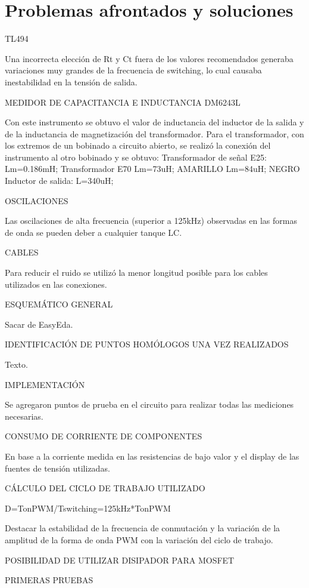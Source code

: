 \section{Problemas afrontados y soluciones}

TL494

Una incorrecta elección de Rt y Ct fuera de los valores recomendados generaba variaciones muy grandes de la frecuencia de switching, 
lo cual causaba inestabilidad en la tensión de salida. 

MEDIDOR DE CAPACITANCIA E INDUCTANCIA DM6243L

Con este instrumento se obtuvo el valor de inductancia del inductor de la salida y de la inductancia de magnetización del transformador. 
Para el transformador, con los extremos de un bobinado a circuito abierto, se realizó la conexión del instrumento al otro bobinado y se obtuvo:
Transformador de señal E25:
Lm=0.186mH; 
Transformador E70
Lm=73uH; AMARILLO 
Lm=84uH; NEGRO
Inductor de salida:
L=340uH;

OSCILACIONES

Las oscilaciones de alta frecuencia (superior a 125kHz) observadas en las formas de onda se pueden deber a cualquier tanque LC. 

CABLES

Para reducir el ruido se utilizó la menor longitud posible para los cables utilizados en las conexiones. 

ESQUEMÁTICO GENERAL 

Sacar de EasyEda. 

IDENTIFICACIÓN DE PUNTOS HOMÓLOGOS UNA VEZ REALIZADOS 

Texto.

IMPLEMENTACIÓN

Se agregaron puntos de prueba en el circuito para realizar todas las mediciones necesarias. 

CONSUMO DE CORRIENTE DE COMPONENTES 

En base a la corriente medida en las resistencias de bajo valor y el display de las fuentes de tensión utilizadas. 

CÁLCULO DEL CICLO DE TRABAJO UTILIZADO 

D=TonPWM/Tswitching=125kHz*TonPWM

Destacar la estabilidad de la frecuencia de conmutación y la variación de la amplitud de la forma de onda PWM con la variación del ciclo de trabajo. 

POSIBILIDAD DE UTILIZAR DISIPADOR PARA MOSFET

PRIMERAS PRUEBAS

